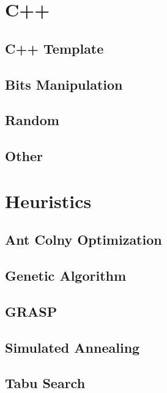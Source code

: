 \section{C++}
\subsection{C++ Template}
\raggedbottom
\hrulefill
\subsection{Bits Manipulation}
\raggedbottom
\hrulefill
\subsection{Random}
\raggedbottom
\hrulefill
\subsection{Other}
\raggedbottom
\hrulefill

\section{Heuristics}
\subsection{Ant Colny Optimization}
\raggedbottom
\hrulefill
\subsection{Genetic Algorithm}
\raggedbottom
\hrulefill
\subsection{GRASP}
\raggedbottom
\hrulefill
\subsection{Simulated Annealing}
\raggedbottom
\hrulefill
\subsection{Tabu Search}
\raggedbottom
\hrulefill
